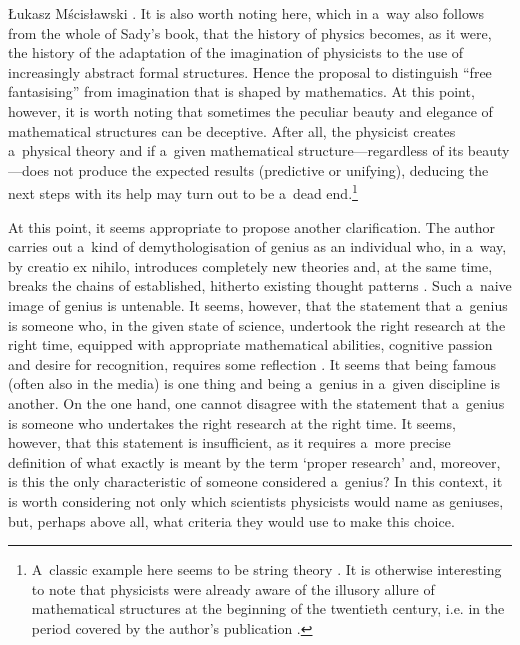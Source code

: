 \begin{newrevengenv}{Łukasz Mścisławski}
\parencite[][p.113]{heller_2011}. %
 It is also worth noting here, which in a~way also follows from the whole of Sady's book, that the history of physics becomes, as it were, the history of the adaptation of the imagination of physicists to the use of increasingly abstract formal structures. Hence the proposal to distinguish ``free fantasising'' from imagination that is shaped by mathematics. At this point, however, it is worth noting that sometimes the peculiar beauty and elegance of mathematical structures can be deceptive. After all, the physicist creates a~physical theory and if a~given mathematical structure---regardless of its beauty---does not produce the expected results (predictive or unifying), deducing the next steps with its help may turn out to be a~dead end.\footnote{A~classic example here seems to be string theory 
\parencites[][pp.291--323]{kragh_higher_2015}[cf. also][]{baggott_farewell_2013}[or][]{hossenfelder_lost_2018}. %
 It is otherwise interesting to note that physicists were already aware of the illusory allure of mathematical structures at the beginning of the twentieth century, i.e. in the period covered by the author's publication  
\parencite[cf., e.g.][pp.17--18]{kalinowski_nauka_1916}.%
}

At this point, it seems appropriate to propose another clarification. The author carries out a~kind of demythologisation of genius as an individual who, in a~way, by creatio ex nihilo, introduces completely new theories and, at the same time, breaks the chains of established, hitherto existing thought patterns
\parencite[][p.219]{sady_struktura_2020}. %
 Such a~naive image of genius is untenable. It seems, however, that the statement that a~genius is someone who, in the given state of science, undertook the right research at the right time, equipped with appropriate mathematical abilities, cognitive passion and desire for recognition, requires some reflection 
\parencite[][p.220]{sady_struktura_2020}. %
 It seems that being famous (often also in the media) is one thing and being a~genius in a~given discipline is another. On the one hand, one cannot disagree with the statement that a~genius is someone who undertakes the right research at the right time. It seems, however, that this statement is insufficient, as it requires a~more precise definition of what exactly is meant by the term `proper research' and, moreover, is this the only characteristic of someone considered a~genius? In this context, it is worth considering not only which scientists physicists would name as geniuses, but, perhaps above all, what criteria they would use to make this choice.


\end{newrevengenv}
